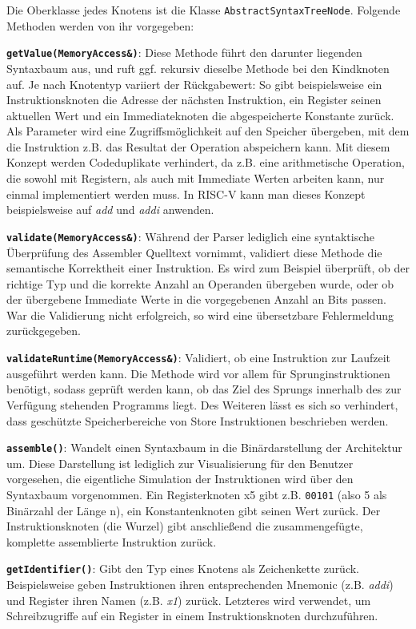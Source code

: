 Die Oberklasse jedes Knotens ist die Klasse \texttt{AbstractSyntaxTreeNode}.
Folgende Methoden werden von ihr vorgegeben:
\begin{sitemize}{-0.3cm}
	\label{dev-manual-arch-node-functions}
	\item \textbf{\texttt{getValue(MemoryAccess\&)}}: Diese Methode führt den
	darunter liegenden Syntaxbaum aus, und ruft ggf. rekursiv dieselbe Methode
	bei den Kindknoten auf. Je nach Knotentyp variiert der Rückgabewert: So gibt
	beispielsweise ein Instruktionsknoten die Adresse der nächsten Instruktion,
	ein Register seinen aktuellen Wert und ein Immediateknoten die
	abgespeicherte Konstante zurück. Als Parameter wird eine Zugriffsmöglichkeit auf den
	Speicher übergeben, mit dem die Instruktion z.B. das Resultat der Operation
	abspeichern kann.
	Mit diesem Konzept werden Codeduplikate verhindert, da z.B. eine arithmetische
	Operation, die sowohl mit Registern, als auch mit Immediate Werten arbeiten
	kann, nur einmal implementiert werden muss. In RISC-V kann man dieses Konzept
	beispielsweise auf \emph{add} und \emph{addi} anwenden.

	\item \textbf{\texttt{validate(MemoryAccess\&)}}: Während der Parser lediglich
	eine syntaktische Überprüfung des Assembler Quelltext vornimmt, validiert
	diese Methode die semantische Korrektheit einer Instruktion. Es wird zum
	Beispiel überprüft, ob der richtige Typ und die korrekte Anzahl an Operanden
	übergeben wurde, oder ob der übergebene Immediate Werte in die vorgegebenen
	Anzahl an Bits passen. War die Validierung nicht erfolgreich, so wird eine
	übersetzbare Fehlermeldung zurückgegeben.

	\item \textbf{\texttt{validateRuntime(MemoryAccess\&)}}: Validiert, ob eine
	Instruktion zur Laufzeit ausgeführt werden kann. Die Methode wird vor allem
	für Sprunginstruktionen benötigt, sodass geprüft werden kann, ob das Ziel
	des Sprungs innerhalb des zur Verfügung stehenden Programms liegt. Des
	Weiteren lässt es sich so verhindert, dass geschützte Speicherbereiche
	von Store Instruktionen beschrieben werden.

	\item \textbf{\texttt{assemble()}}: Wandelt einen Syntaxbaum in die
	Binärdarstellung der Architektur um. Diese Darstellung ist lediglich zur
	Visualisierung für den Benutzer vorgesehen, die eigentliche Simulation der
	Instruktionen wird über den Syntaxbaum vorgenommen. Ein Registerknoten x5
	gibt z.B. \texttt{00101} (also 5 als Binärzahl der Länge n), ein Konstantenknoten gibt seinen Wert
	zurück. Der Instruktionsknoten (die Wurzel) gibt anschließend die
	zusammengefügte, komplette assemblierte Instruktion zurück.

	\item \textbf{\texttt{getIdentifier()}}: Gibt den Typ eines Knotens als
	Zeichenkette zurück. Beispielsweise geben Instruktionen ihren entsprechenden
	Mnemonic (z.B. \emph{addi}) und Register ihren Namen (z.B. \emph{x1})
	zurück. Letzteres wird verwendet, um Schreibzugriffe auf ein Register
	in einem Instruktionsknoten durchzuführen.
\end{sitemize}

